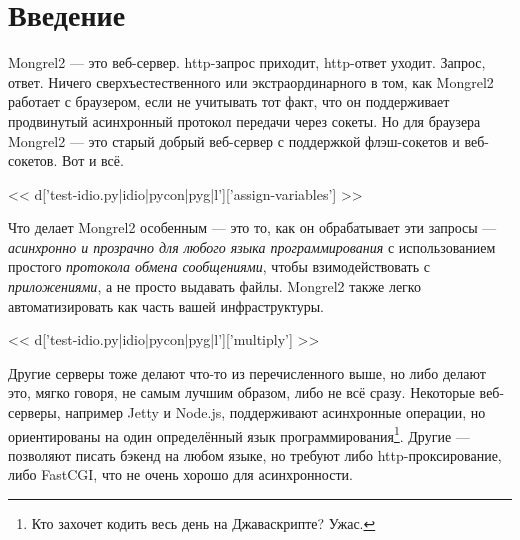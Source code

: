 \documentclass[11pt,a4paper]{article}
\begin{document}
\chapter{Введение}

Mongrel2 --- это веб-сервер. http-запрос приходит, http-ответ уходит.
Запрос, ответ. Ничего сверхъестественного или экстраординарного в том, как
Mongrel2 работает с браузером, если не учитывать тот факт, что он поддерживает
продвинутый асинхронный протокол передачи через сокеты. Но для браузера
Mongrel2 --- это старый добрый веб-сервер с поддержкой флэш-сокетов и веб-сокетов.
Вот и всё.

<< d['test-idio.py|idio|pycon|pyg|l']['assign-variables'] >>

Что делает Mongrel2 особенным --- это то, как он обрабатывает эти запросы ---
\emph{асинхронно и прозрачно для любого языка программирования} с использованием
простого \emph{протокола обмена сообщениями}, чтобы взимодействовать с \emph{приложениями}, а
не просто выдавать файлы. Mongrel2 также легко автоматизировать как часть вашей
инфраструктуры.

<< d['test-idio.py|idio|pycon|pyg|l']['multiply'] >>

Другие серверы тоже делают что-то из перечисленного выше, но либо делают это, мягко говоря,
не самым лучшим образом, либо не всё сразу. Некоторые веб-серверы, например Jetty
и Node.js, поддерживают асинхронные операции, но ориентированы на один определённый язык
программирования\footnote{Кто захочет кодить весь день на Джаваскрипте? Ужас.}. Другие ---
позволяют писать бэкенд на любом языке, но требуют либо http-проксирование, либо FastCGI,
что не очень хорошо для асинхронности.
\end{document}
